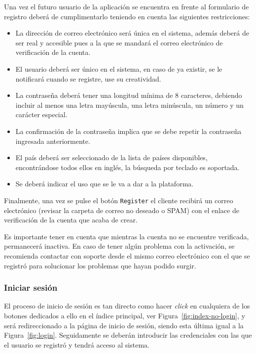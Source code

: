 Una vez el futuro usuario de la aplicación se encuentra en frente al formulario de registro deberá de cumplimentarlo teniendo en cuenta las siguientes restricciones:
\begin{itemize}
\item La dirección de correo electrónico será única en el sistema, además deberá de ser real y accesible pues a la que se mandará el correo electrónico de verificación de la cuenta.
\item El usuario deberá ser único en el sistema, en caso de ya existir, se le notificará cuando se registre, use su creatividad.
\item La contraseña deberá tener una longitud mínima de 8 caracteres, debiendo incluir al menos una letra mayúscula, una letra minúscula, un número y un carácter especial.
\item La confirmación de la contraseña implica que se debe repetir la contraseña ingresada anteriormente.
\item El país deberá ser seleccionado de la lista de países disponibles, encontrándose todos ellos en inglés, la búsqueda por teclado es soportada.
\item Se deberá indicar el uso que se le va a dar a la plataforma.
\end{itemize}

Finalmente, una vez se pulse el botón \texttt{Register} el cliente recibirá un correo electrónico (revisar la carpeta de correo no deseado o SPAM) con el enlace de verificación de la cuenta que acaba de crear.

Es importante tener en cuenta que mientras la cuenta no se encuentre verificada, permanecerá inactiva. En caso de tener algún problema con la activación, se recomienda contactar con soporte desde el mismo correo electrónico con el que se registró para solucionar los problemas que hayan podido surgir.

\subsubsection{Iniciar sesión}
El proceso de inicio de sesión es tan directo como hacer \textit{click} en cualquiera de los botones dedicados a ello en el índice principal, ver Figura~\ref{fig:index-no-login}, y será redireccionado a la página de inicio de sesión, siendo esta última igual a la Figura~\ref{fig:login}. Seguidamente se deberán introducir las credenciales con las que el usuario se registró y tendrá acceso al sistema.

